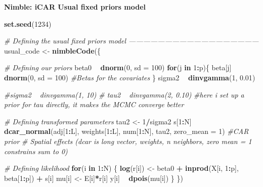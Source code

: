 \documentclass[]{article}
\newenvironment{Shaded}{\begin{snugshade}}{\end{snugshade}}
\newcommand{\CommentTok}[1]{\textcolor[rgb]{0.56,0.35,0.01}{\textit{#1}}}
\newcommand{\ControlFlowTok}[1]{\textcolor[rgb]{0.13,0.29,0.53}{\textbf{#1}}}
\newcommand{\DataTypeTok}[1]{\textcolor[rgb]{0.13,0.29,0.53}{#1}}
\newcommand{\DecValTok}[1]{\textcolor[rgb]{0.00,0.00,0.81}{#1}}
\newcommand{\FloatTok}[1]{\textcolor[rgb]{0.00,0.00,0.81}{#1}}
\newcommand{\KeywordTok}[1]{\textcolor[rgb]{0.13,0.29,0.53}{\textbf{#1}}}
\newcommand{\NormalTok}[1]{#1}
\newcommand{\OperatorTok}[1]{\textcolor[rgb]{0.81,0.36,0.00}{\textbf{#1}}}
\newcommand{\StringTok}[1]{\textcolor[rgb]{0.31,0.60,0.02}{#1}}
\begin{document}
\textbf{Nimble: iCAR Usual fixed priors model}

\begin{Shaded}
\begin{Highlighting}[]
\KeywordTok{set.seed}\NormalTok{(}\DecValTok{1234}\NormalTok{)}

\CommentTok{# Defining the usual fixed priors model ------------------------------------------------------}
\NormalTok{usual_code <-}\StringTok{ }\KeywordTok{nimbleCode}\NormalTok{(\{}
  
  \CommentTok{# Defining our priors}
\NormalTok{  beta0 }\OperatorTok{~}\StringTok{ }\KeywordTok{dnorm}\NormalTok{(}\DecValTok{0}\NormalTok{, }\DataTypeTok{sd =} \DecValTok{100}\NormalTok{)}
  \ControlFlowTok{for}\NormalTok{(j }\ControlFlowTok{in} \DecValTok{1}\OperatorTok{:}\NormalTok{p)\{}
\NormalTok{    beta[j] }\OperatorTok{~}\StringTok{ }\KeywordTok{dnorm}\NormalTok{(}\DecValTok{0}\NormalTok{, }\DataTypeTok{sd =} \DecValTok{100}\NormalTok{)  }\CommentTok{#Betas for the covariates}
\NormalTok{  \}}
\NormalTok{  sigma2 }\OperatorTok{~}\StringTok{ }\KeywordTok{dinvgamma}\NormalTok{(}\DecValTok{1}\NormalTok{, }\FloatTok{0.01}\NormalTok{)}

  \CommentTok{#sigma2 ~ dinvgamma(1, 10) }
  \CommentTok{# tau2 ~ dinvgamma(2, 0.10) }
  \CommentTok{#here i set up a prior for tau directly, it makes the MCMC converge better}
  
  \CommentTok{# Defining transformed parameters}
\NormalTok{  tau2 <-}\StringTok{ }\DecValTok{1}\OperatorTok{/}\NormalTok{sigma2}
\NormalTok{  s[}\DecValTok{1}\OperatorTok{:}\NormalTok{N] }\OperatorTok{~}\StringTok{ }\KeywordTok{dcar_normal}\NormalTok{(adj[}\DecValTok{1}\OperatorTok{:}\NormalTok{L], weights[}\DecValTok{1}\OperatorTok{:}\NormalTok{L], num[}\DecValTok{1}\OperatorTok{:}\NormalTok{N], tau2, }\DataTypeTok{zero_mean =} \DecValTok{1}\NormalTok{) }\CommentTok{#CAR prior}
  \CommentTok{# Spatial effects (dcar is long vector, weights, n neighbors, zero mean = 1 constrains sum to 0)}

  \CommentTok{# Defining likelihood }
  \ControlFlowTok{for}\NormalTok{(i }\ControlFlowTok{in} \DecValTok{1}\OperatorTok{:}\NormalTok{N) \{ }
    \KeywordTok{log}\NormalTok{(r[i]) <-}\StringTok{ }\NormalTok{beta0 }\OperatorTok{+}\StringTok{ }\KeywordTok{inprod}\NormalTok{(X[i, }\DecValTok{1}\OperatorTok{:}\NormalTok{p], beta[}\DecValTok{1}\OperatorTok{:}\NormalTok{p]) }\OperatorTok{+}\StringTok{ }\NormalTok{s[i]}
\NormalTok{    mu[i] <-}\StringTok{ }\NormalTok{E[i]}\OperatorTok{*}\NormalTok{r[i] }
\NormalTok{    y[i] }\OperatorTok{~}\StringTok{ }\KeywordTok{dpois}\NormalTok{(mu[i]) }
\NormalTok{  \} }
\NormalTok{\})}
\end{Highlighting}
\end{Shaded}
\end{document}
